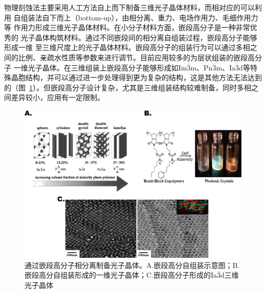 物理刻蚀法主要采用人工方法自上而下制备三维光子晶体材料，而相对应的可以利用
自组装法自下而上（bottom-up），由相分离、重力、电场作用力、毛细作用力等
作用力形成三维光子晶体材料。在小分子材料方面，嵌段高分子是一种非常优秀的
光子晶体构筑材料。通过不同嵌段间的相分离自组装过程，嵌段高分子能够形成一维
至三维尺度上的光子晶体材料\cite{Fink1999Block}。嵌段高分子的组装行为可以通过多相之间的比例、亲疏水性质等参数来进行调节。目前应用较多的为层状组装的嵌段高分子
一维光子晶体\cite{Kang2009Full,Miyake2012Synthesis}。在三维组装上嵌段高分子能够形成如Im${\bar 3}$m、Pn${\bar 3}$m、Ia${\bar 3}$d等特殊晶胞结构，并可以通过进一步处理得到更为复杂的结构\cite{Hsueh2010Inorganic,Hsueh2014Shifting}，这是其他方法无法达到的（图~\ref{fig:copol}）。但嵌段高分子设计复杂，尤其是三维组装结构较难制备，同时多相之间差异较小，应用有一定限制。
\begin{figure}[htbp]
	\centering
	\includegraphics[width=0.8\linewidth]{figures/copol.png}
	\caption{通过嵌段高分子相分离制备光子晶体。A.嵌段高分自组装示意图\cite{Fink1999Block}；B.嵌段高分自组装形成的一维光子晶体\cite{Miyake2012Synthesis}；C.嵌段高分子形成的Ia${\bar 3}$d三维光子晶体\cite{Hsueh2010Inorganic}}
	\label{fig:copol}
\end{figure}

